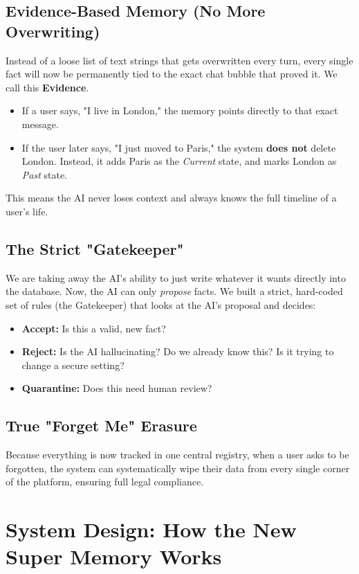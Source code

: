 \documentclass[12pt]{article}
\begin{document}
\subsection{Evidence-Based Memory (No More Overwriting)}
Instead of a loose list of text strings that gets overwritten every turn, every single fact will now be permanently tied to the exact chat bubble that proved it. We call this \textbf{Evidence}. 
\begin{itemize}
    \item If a user says, "I live in London," the memory points directly to that exact message.
    \item If the user later says, "I just moved to Paris," the system \textbf{does not} delete London. Instead, it adds Paris as the \textit{Current} state, and marks London as \textit{Past} state. 
\end{itemize}
This means the AI never loses context and always knows the full timeline of a user's life.

\subsection{The Strict "Gatekeeper"}
We are taking away the AI's ability to just write whatever it wants directly into the database. Now, the AI can only \textit{propose} facts. We built a strict, hard-coded set of rules (the Gatekeeper) that looks at the AI's proposal and decides:
\begin{itemize}[noitemsep]
    \item \textbf{Accept:} Is this a valid, new fact?
    \item \textbf{Reject:} Is the AI hallucinating? Do we already know this? Is it trying to change a secure setting?
    \item \textbf{Quarantine:} Does this need human review?
\end{itemize}

\subsection{True "Forget Me" Erasure}
Because everything is now tracked in one central registry, when a user asks to be forgotten, the system can systematically wipe their data from every single corner of the platform, ensuring full legal compliance.

\section{System Design: How the New Super Memory Works}
\end{document}
